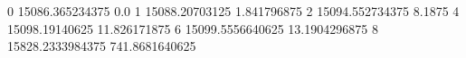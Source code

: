 0 15086.365234375 0.0
1 15088.20703125 1.841796875
2 15094.552734375 8.1875
4 15098.19140625 11.826171875
6 15099.5556640625 13.1904296875
8 15828.2333984375 741.8681640625
